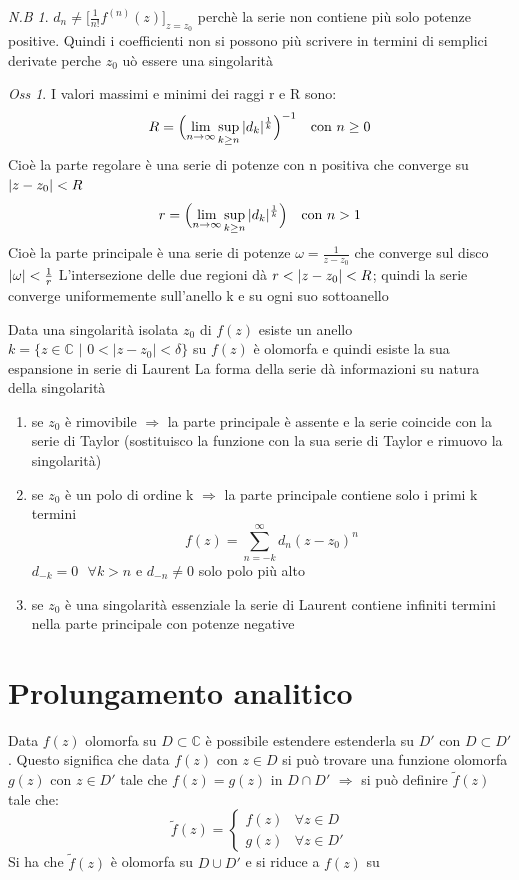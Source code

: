 \documentclass[a4paper,11pt]{report}
\theoremstyle{remark}
\newtheorem*{oss}{Oss}
\newtheorem*{nb}{N.B}
\theoremstyle{definition}
\DeclarePairedDelimiter{\abs}{\lvert}{\rvert}
\begin{document}
	\begin{nb}
		$ d_n \neq \bigl[\frac{1}{n!} f^{(n)}(z)\bigr]_{z=z_0}$ perchè la serie non contiene più solo potenze positive. \newline
		Quindi i coefficienti non si possono più scrivere in termini di semplici derivate perche $z_0$ uò essere una singolarità
	\end{nb}

	\begin{oss}
		I valori massimi e minimi dei raggi r e R sono:
		\[R =\Bigl(\lim_{n \to \infty} \sup_{k\ge n} |d_k|^{\frac{1}{k}}\Bigr)^{-1} \quad \mbox{con } n \ge 0\] 
		Cioè la parte regolare è una serie di potenze con n positiva che converge su $\abs{z-z_0}<R$
		\[ r =\Bigl(\lim_{n \to \infty} \sup_{k\ge n} |d_k|^{\frac{1}{k}}\Bigr) \quad \mbox{con } n > 1\]
		Cioè la parte principale è una serie di potenze $\omega = \frac{1}{z-z_0}$ che converge sul disco $\abs{\omega}<\frac{1}{r}$ \newline
		\noindent L'intersezione delle due regioni dà $r< \abs{z-z_0}<R$; quindi la serie converge uniformemente sull'anello k e su ogni suo sottoanello
	\end{oss}

	\noindent Data una singolarità isolata $z_0$ di $f(z)$ esiste un anello $k = \{z \in \mathbb{C} \mbox{ | } 0< |z-z_0|<\delta\}$ su $f(z)$  è olomorfa  e quindi esiste la sua espansione in serie di Laurent \newline
	\noindent La forma della serie dà informazioni su natura della singolarità
	
	\begin{enumerate}
		\item se $z_0$ è rimovibile $\Rightarrow$ la parte principale è assente e la serie coincide con la serie di Taylor (sostituisco la funzione con la sua serie di Taylor e rimuovo la singolarità)
		\item se $z_0$ è un polo di ordine k $\Rightarrow$ la parte principale contiene solo i primi k termini 
		\[f(z) = \sum_{n = -k}^{\infty} d_n (z-z_0)^n\]
		$d_{-k} = 0 \mbox{ } \forall k>n \mbox{ e } d_{-n} \neq 0$ solo polo più alto
		\item se $z_0$ è una singolarità essenziale la serie di Laurent contiene infiniti termini nella parte principale con potenze negative
	\end{enumerate}
	
\section{Prolungamento analitico}
	Data $f(z)$ olomorfa su $D \subset \mathbb{C}$ è possibile estendere estenderla su $D' \mbox{ con } D \subset D'$. Questo significa che data $f(z)$ con $z \in D$ si può trovare una funzione olomorfa $g(z)$ con $z \in D'$ tale che $f(z) = g(z) \mbox{ in } D \cap D'$ 
	$\Rightarrow$ si può definire $\tilde{f}(z)$ tale che:
	\[\tilde{f}(z) =
	\begin{cases}
			f(z) & \forall z \in D\\
			g(z) & \forall z \in D'
	\end{cases}\]
	Si ha che  $\tilde{f}(z)$ è olomorfa su $D \cup D'$ e si riduce a $f(z)$ su 
	
\end{document}
